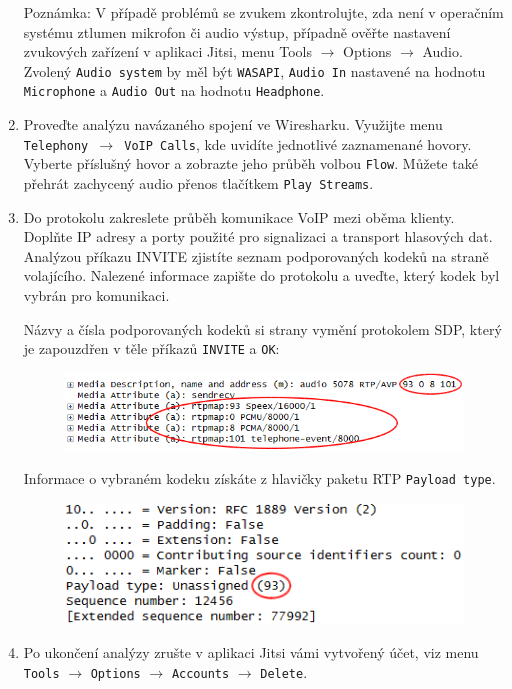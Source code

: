 \documentclass[a4paper,11pt]{article}
\begin{document}
\begin{enumerate}
     {\small Poznámka: V případě problémů se zvukem zkontrolujte, zda není v operačním systému ztlumen mikrofon či audio výstup, případně ověřte nastavení zvukových zařízení v aplikaci Jitsi, menu Tools $\rightarrow$ Options $\rightarrow$ Audio. Zvolený {\tt Audio system} by měl být {\tt WASAPI}, {\tt Audio In} nastavené na hodnotu {\tt Microphone} a {\tt Audio Out} na hodnotu {\tt Headphone}.}
 
   \item Proveďte analýzu navázaného spojení ve Wiresharku. Využijte menu {\tt Telephony $\rightarrow$ VoIP Calls}, kde uvidíte jednotlivé zaznamenané hovory. Vyberte příslušný hovor a zobrazte jeho průběh volbou {\tt Flow}.  Můžete také přehrát zachycený audio přenos tlačítkem {\tt Play Streams}.
     
    \item Do protokolu zakreslete průběh komunikace VoIP mezi oběma klienty. Doplňte IP adresy a porty použité pro signalizaci a transport hlasových dat. Analýzou příkazu INVITE zjistíte seznam podporovaných kodeků na straně volajícího. Nalezené informace zapište do protokolu a uveďte, který kodek byl vybrán pro komunikaci. 

      Názvy a čísla podporovaných kodeků si strany vymění protokolem SDP, který je zapouzdřen v těle příkazů {\tt INVITE} a {\tt OK}:
\begin{figure}[h!]
  \centering
  \includegraphics[scale=0.65]{img/3a.png}
\end{figure}

\noindent Informace o vybraném kodeku získáte z hlavičky paketu RTP {\tt Payload type}.
\begin{figure}[h!]
  \centering
  \includegraphics[scale=0.65]{img/3b.png}
\end{figure}

  \item Po ukončení analýzy zrušte v aplikaci Jitsi vámi vytvořený účet, viz menu {\tt Tools} $\rightarrow$ {\tt Options} $\rightarrow$ {\tt Accounts} $\rightarrow$ {\tt Delete}. 
\end{enumerate}
\end{document}
